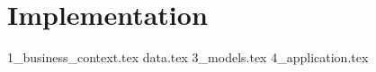 \chapter{Implementation}

{1_business_context.tex}
{data.tex}
{3_models.tex}
{4_application.tex}



